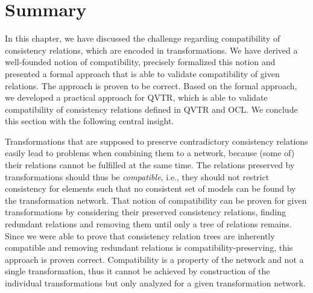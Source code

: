 \section{Summary}

In this chapter, we have discussed the challenge regarding compatibility of consistency relations, which are encoded in transformations.
We have derived a well-founded notion of compatibility, precisely formalized this notion and presented a formal approach that is able to validate compatibility of given relations.
The approach is proven to be correct.
Based on the formal approach, we developed a practical approach for \gls{QVTR}, which is able to validate compatibility of consistency relations defined in \gls{QVTR} and \gls{OCL}.
We conclude this section with the following central insight.

\begin{insight}[Compatibility]
    Transformations that are supposed to preserve contradictory consistency relations easily lead to problems when combining them to a network, because (some of) their relations cannot be fulfilled at the same time.
    The relations preserved by transformations should thus be \emph{compatible}, i.e., they should not restrict consistency for elements such that no consistent set of models can be found by the transformation network.
    That notion of compatibility can be proven for given transformations by considering their preserved consistency relations, finding redundant relations and removing them until only a tree of relations remains. Since we were able to prove that consistency relation trees are inherently compatible and removing redundant relations is compatibility-preserving, this approach is proven correct.
    Compatibility is a property of the network and not a single transformation, thus it cannot be achieved by construction of the individual transformations but only analyzed for a given transformation network.
\end{insight}


